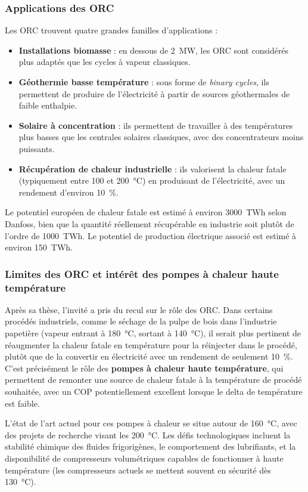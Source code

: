 \subsubsection{Applications des ORC}

Les ORC trouvent quatre grandes familles d'applications :
\begin{itemize}
    \item \textbf{Installations biomasse} : en dessous de 2~MW, les ORC sont considérés plus adaptés que les cycles à vapeur classiques.
    \item \textbf{Géothermie basse température} : sous forme de \textit{binary cycles}, ils permettent de produire de l'électricité à partir de sources géothermales de faible enthalpie.
    \item \textbf{Solaire à concentration} : ils permettent de travailler à des températures plus basses que les centrales solaires classiques, avec des concentrateurs moins puissants.
    \item \textbf{Récupération de chaleur industrielle} : ils valorisent la chaleur fatale (typiquement entre 100 et 200~°C) en produisant de l'électricité, avec un rendement d'environ 10~\%.
\end{itemize}

Le potentiel européen de chaleur fatale est estimé à environ 3000~TWh selon Danfoss, bien que la quantité réellement récupérable en industrie soit plutôt de l'ordre de 1000~TWh. Le potentiel de production électrique associé est estimé à environ 150~TWh.

\subsubsection{Limites des ORC et intérêt des pompes à chaleur haute température}

Après sa thèse, l'invité a pris du recul sur le rôle des ORC. Dans certains procédés industriels, comme le séchage de la pulpe de bois dans l'industrie papetière (vapeur entrant à 180~°C, sortant à 140~°C), il serait plus pertinent de réaugmenter la chaleur fatale en température pour la réinjecter dans le procédé, plutôt que de la convertir en électricité avec un rendement de seulement 10~\%. C'est précisément le rôle des \textbf{pompes à chaleur haute température}, qui permettent de remonter une source de chaleur fatale à la température de procédé souhaitée, avec un COP potentiellement excellent lorsque le delta de température est faible.

L'état de l'art actuel pour ces pompes à chaleur se situe autour de 160~°C, avec des projets de recherche visant les 200~°C. Les défis technologiques incluent la stabilité chimique des fluides frigorigènes, le comportement des lubrifiants, et la disponibilité de compresseurs volumétriques capables de fonctionner à haute température (les compresseurs actuels se mettent souvent en sécurité dès 130~°C).

